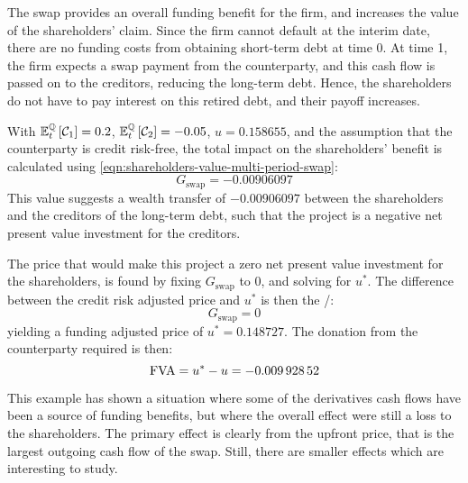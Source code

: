 \documentclass[main.tex]{subfiles}
\begin{document}
        The swap provides an overall funding benefit for the firm,
        and increases the value of the shareholders' claim.
        Since the firm cannot default at the interim date,
        there are no funding costs from obtaining short-term debt at time 0.
        At time 1, the firm expects a swap payment from the counterparty,
        and this cash flow is passed on to the creditors, reducing the long-term debt.
        Hence, the shareholders do not have to pay interest on this retired debt,
        and their payoff increases.

        With $\mathbb{E}_{t}^{\mathbb{Q}}\left[\mathcal{C}_1\right]=\num{0.2}$,
        $\mathbb{E}_{t}^{\mathbb{Q}}\left[\mathcal{C}_2\right]=\num{-0.05}$,
        $u=\num{0.158655}$,
        and the assumption that the counterparty is credit risk-free,
        the total impact on the shareholders' benefit is calculated using \cref{eqn:shareholders-value-multi-period-swap}:
        \begin{equation}
            G_{\text{swap}} = \num{-0.00906097}
        \end{equation}
        This value suggests a wealth transfer of $\num{-0.00906097}$
        between the shareholders and the creditors of the long-term debt,
        such that the project is a negative net present value investment for the creditors.

        The price that would make this project a zero net present value investment for the shareholders,
        is found by fixing $G_{\text{swap}}$ to 0,
        and solving for $u^{\ast}$.
        The difference between the credit risk adjusted price and $u^{\ast}$ is then the \FVA/:
        \begin{equation}
            G_{\text{swap}} = 0
        \end{equation}
        yielding a funding adjusted price of $u^{\ast} = \num{0.148727}$.
        The donation from the counterparty required is then:
        \begin{equation}
            \FVA/ = u^{\ast} - u = \num{-0.00992852}
        \end{equation}

        This example has shown a situation where some of the derivatives cash flows have
        been a source of funding benefits,
        but where the overall effect were still a loss to the shareholders.
        The primary effect is clearly from the upfront price,
        that is the largest outgoing cash flow of the swap.
        Still, there are smaller effects which are interesting to study.
\end{document}
